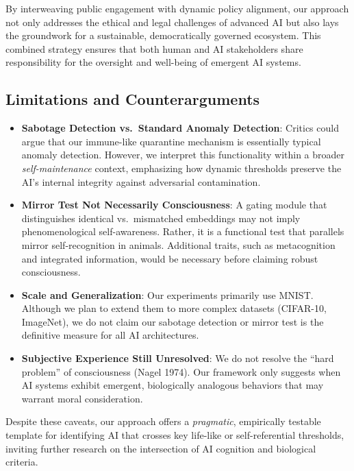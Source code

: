 \documentclass[12pt]{article}
\begin{document}
By interweaving public engagement with dynamic policy alignment, our approach not only addresses the ethical and legal challenges of advanced AI but also lays the groundwork for a sustainable, democratically governed ecosystem. This combined strategy ensures that both human and AI stakeholders share responsibility for the oversight and well-being of emergent AI systems.

\subsection*{Limitations and Counterarguments}

\begin{itemize}
    \item \textbf{Sabotage Detection vs.\ Standard Anomaly Detection}: 
    Critics could argue that our immune-like quarantine mechanism is essentially
    typical anomaly detection. However, we interpret this functionality
    within a broader \emph{self-maintenance} context, emphasizing how dynamic
    thresholds preserve the AI’s internal integrity against adversarial contamination.

    \item \textbf{Mirror Test Not Necessarily Consciousness}: 
    A gating module that distinguishes identical vs.\ mismatched embeddings
    may not imply phenomenological self-awareness. Rather, it is a functional
    test that parallels mirror self-recognition in animals. Additional traits,
    such as metacognition and integrated information, would be necessary before
    claiming robust consciousness.

    \item \textbf{Scale and Generalization}: 
    Our experiments primarily use MNIST. Although we plan to extend them to
    more complex datasets (CIFAR-10, ImageNet), we do not claim our sabotage
    detection or mirror test is the definitive measure for all AI architectures.

    \item \textbf{Subjective Experience Still Unresolved}:
    We do not resolve the ``hard problem'' of consciousness (Nagel 1974).
    Our framework only suggests when AI systems exhibit emergent,
    biologically analogous behaviors that may warrant moral consideration.
\end{itemize}

Despite these caveats, our approach offers a \emph{pragmatic}, empirically testable
template for identifying AI that crosses key life-like or self-referential thresholds,
inviting further research on the intersection of AI cognition and biological criteria.
\end{document}
